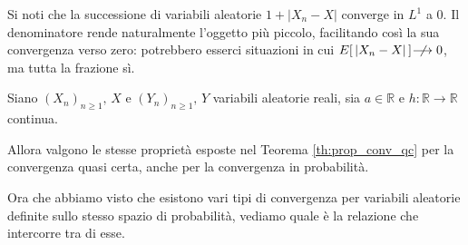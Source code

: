 Si noti che la successione di variabili aleatorie $1+|X_n-X|$ converge in $L^1$ a 0. Il denominatore rende naturalmente l'oggetto più piccolo, facilitando così la sua convergenza verso zero: potrebbero esserci situazioni in cui $E\!\left[\,|X_n - X|\,\right] \;\not\!\!\!\longrightarrow
 0$, ma tutta la frazione sì.

\begin{proposizione}
\label{prop:15.11}
    Siano $(X_n)_{n\geq1}, \, X$ e $(Y_n)_{n\geq1}, \, Y$ variabili aleatorie reali, sia $a\in\mathbb{R}$ e $h:\mathbb{R}\to\mathbb{R}$ continua. 

    \medskip
    \noindent Allora valgono le stesse proprietà esposte nel Teorema \ref{th:prop_conv_qc} per la convergenza quasi certa, anche per la convergenza in probabilità.
\end{proposizione}

\bigskip
\noindent Ora che abbiamo visto che esistono vari tipi di convergenza per variabili aleatorie definite sullo stesso spazio di probabilità, vediamo quale è la relazione che intercorre tra di esse.

